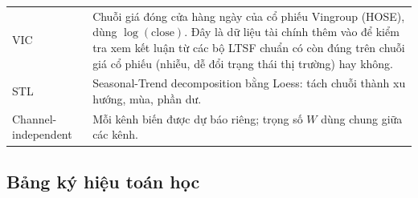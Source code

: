 \begin{center}
\begin{tabular}{@{}>{\raggedright\arraybackslash}p{}
    >{\raggedright\arraybackslash}p{}@{}}
    \addlinespace
    VIC
                       & Chuỗi giá đóng cửa hàng ngày của cổ phiếu Vingroup (HOSE), dùng \(\log(\mathrm{close})\).
                         Đây là dữ liệu tài chính thêm vào để kiểm tra xem kết luận từ các bộ LTSF chuẩn
                         có còn đúng trên chuỗi giá cổ phiếu (nhiễu, dễ đổi trạng thái thị trường) hay không. \\
    \addlinespace
    STL
                       & Seasonal-Trend decomposition bằng Loess: tách chuỗi thành xu hướng, mùa, phần dư.                       \\
    \addlinespace
    Channel-independent
                       & Mỗi kênh biến được dự báo riêng; trọng số \(W\) dùng chung giữa các kênh.                               \\
    \bottomrule
  \end{tabular}
\end{center}

\subsection{Bảng ký hiệu toán học}

